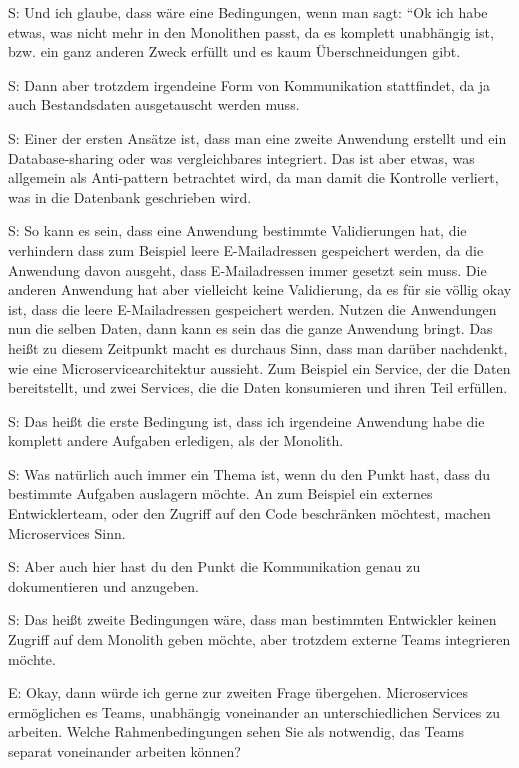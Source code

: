  \label{appendix:s-5}
S: Und ich glaube, dass wäre eine Bedingungen, wenn man sagt: “Ok ich habe etwas, was nicht mehr in den Monolithen passt, da es komplett unabhängig ist, bzw. ein ganz anderen Zweck erfüllt und es kaum Überschneidungen gibt.

 \label{appendix:s-6}  \label{appendix:s-7}
S: Dann aber trotzdem irgendeine Form von Kommunikation stattfindet, da ja auch Bestandsdaten ausgetauscht werden muss.

S: Einer der ersten Ansätze ist, dass man eine zweite Anwendung erstellt und ein Database-sharing oder was vergleichbares integriert. Das ist aber etwas, was allgemein als Anti-pattern betrachtet wird, da man damit die Kontrolle verliert, was in die Datenbank geschrieben wird.

 \label{appendix:s-8}
S: So kann es sein, dass eine Anwendung bestimmte Validierungen hat, die verhindern dass zum Beispiel leere E-Mailadressen gespeichert werden, da die Anwendung davon ausgeht, dass E-Mailadressen immer gesetzt sein muss. Die anderen Anwendung hat aber vielleicht keine Validierung, da es für sie völlig okay ist, dass die leere E-Mailadressen gespeichert werden. Nutzen die Anwendungen nun die selben Daten, dann kann es sein das die ganze Anwendung bringt. Das heißt zu diesem Zeitpunkt macht es durchaus Sinn, dass man darüber nachdenkt, wie eine Microservicearchitektur aussieht. Zum Beispiel ein Service, der die Daten bereitstellt, und zwei Services, die die Daten konsumieren und ihren Teil erfüllen.

 \label{appendix:s-9}
S: Das heißt die erste Bedingung ist, dass ich irgendeine Anwendung habe die komplett andere Aufgaben erledigen, als der Monolith.

 \label{appendix:s-10}  \label{appendix:s-11}
S: Was natürlich auch immer ein Thema ist, wenn du den Punkt hast, dass du bestimmte Aufgaben auslagern möchte. An zum Beispiel ein externes Entwicklerteam, oder den Zugriff auf den Code beschränken möchtest, machen Microservices Sinn.

 \label{appendix:s-12}
S: Aber auch hier hast du den Punkt die Kommunikation genau zu dokumentieren und anzugeben.

S: Das heißt zweite Bedingungen wäre, dass man bestimmten Entwickler keinen Zugriff auf dem Monolith geben möchte, aber trotzdem externe Teams integrieren möchte.

E: Okay, dann würde ich gerne zur zweiten Frage übergehen.
Microservices ermöglichen es Teams, unabhängig voneinander an unterschiedlichen Services zu arbeiten. Welche Rahmenbedingungen sehen Sie als notwendig, das Teams separat voneinander arbeiten können? 

